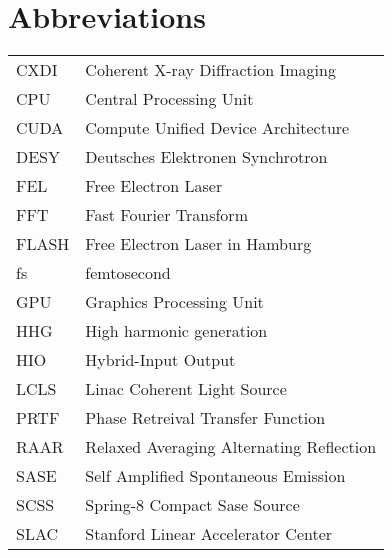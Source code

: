 \chapter*{Abbreviations}\label{sec:abrv}

\begin{tabular}{ll}
CXDI    &Coherent X-ray Diffraction Imaging\\
CPU     &Central Processing Unit\\
CUDA    &Compute Unified Device Architecture\\
DESY    &Deutsches Elektronen Synchrotron\\
FEL     &Free Electron Laser\\
FFT     &Fast Fourier Transform\\
FLASH   &Free Electron Laser in Hamburg\\
fs      &femtosecond\\
GPU     &Graphics Processing Unit\\
HHG     &High harmonic generation\\
HIO     &Hybrid-Input Output\\
LCLS    &Linac Coherent Light Source\\
PRTF    &Phase Retreival Transfer Function\\
RAAR    &Relaxed Averaging Alternating Reflection\\
SASE    &Self Amplified Spontaneous Emission\\  
SCSS    &Spring-8 Compact Sase Source\\
SLAC    &Stanford Linear Accelerator Center\\

\end{tabular}
